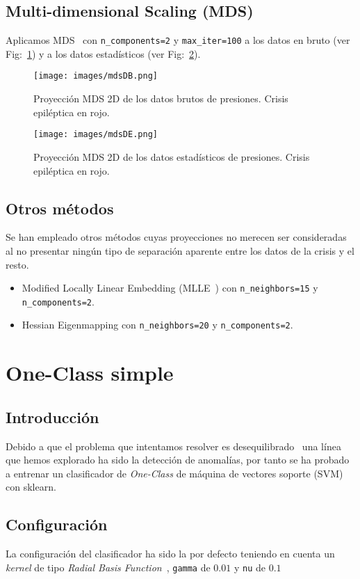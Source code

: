 \documentclass[a4paper,12pt,twoside,oldfontcommands]{memoir}
\begin{document}
\section{Multi-dimensional Scaling (MDS)}
Aplicamos MDS~\cite{kruskal1964nonmetric,borg2003modern} con \texttt{n\_components=2} y \texttt{max\_iter=100} a los datos en bruto (ver Fig:~\ref{fig:mdsDB}) y a los datos estadísticos (ver Fig:~\ref{fig:mdsDE}).
\begin{figure}
    \centering
    \texttt{[image: images/mdsDB.png]}
    \caption{Proyección MDS 2D de los datos brutos de presiones. Crisis epiléptica en rojo.}
    \label{fig:mdsDB}
\end{figure}
\begin{figure}
    \centering
    \texttt{[image: images/mdsDE.png]}
    \caption{Proyección MDS 2D de los datos estadísticos de presiones. Crisis epiléptica en rojo.}
    \label{fig:mdsDE}
\end{figure}
\section{Otros métodos}
Se han empleado otros métodos cuyas proyecciones no merecen ser consideradas al no presentar ningún tipo de separación aparente entre los datos de la crisis y el resto. 
\begin{itemize}
    \item Modified Locally Linear Embedding (MLLE~\cite{zhang2007mlle}) con \texttt{n\_neighbors=15} y \texttt{n\_components=2}.
    \item Hessian Eigenmapping con \texttt{n\_neighbors=20} y \texttt{n\_components=2}. 
\end{itemize}
\chapter{One-Class simple}
\section{Introducción}
Debido a que el problema que intentamos resolver es desequilibrado~\cite{galar2012review} una línea que hemos explorado ha sido la detección de anomalías, por tanto se ha probado a entrenar un clasificador de \textit{One-Class} de máquina de vectores soporte (SVM) con sklearn.
\section{Configuración}
La configuración del clasificador ha sido la por defecto teniendo en cuenta un \textit{kernel} de tipo \textit{Radial Basis Function}~\cite{wiki:rbf}, \texttt{gamma} de \(0.01\) y \texttt{nu} de \(0.1\) 
\end{document}
